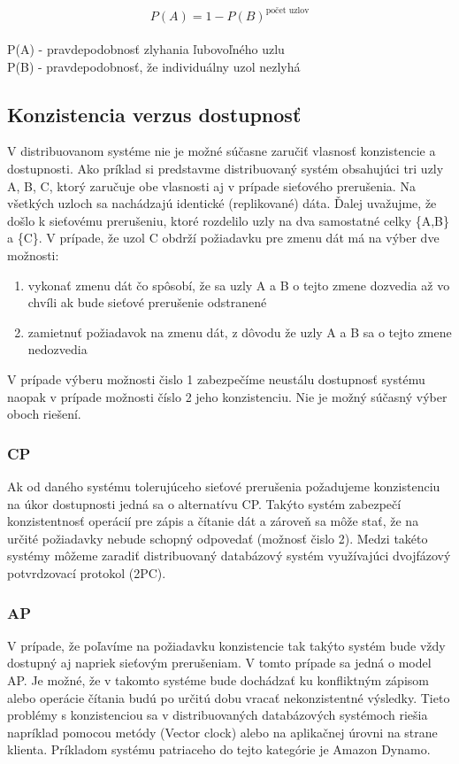 \documentclass[11pt,twoside,a4paper]{book}
\begin{document}
$$P(A) = 1 - P(B)^{\textrm{počet uzlov}}$$
\\
P(A) - pravdepodobnosť zlyhania ľubovoľného uzlu \\
P(B) - pravdepodobnosť, že individuálny uzol nezlyhá

\subsection{Konzistencia verzus dostupnosť}

V distribuovanom systéme nie je možné súčasne zaručiť vlasnosť konzistencie a dostupnosti. Ako príklad si predstavme distribuovaný systém obsahujúci tri uzly A, B, C, ktorý zaručuje obe vlasnosti aj v prípade sieťového prerušenia. Na všetkých uzloch sa nachádzajú identické (replikované) dáta. Ďalej uvažujme, že došlo k sieťovému prerušeniu, ktoré rozdelilo uzly na dva samostatné celky \{A,B\} a \{C\}. V prípade, že uzol C obdrží požiadavku pre zmenu dát má na výber dve možnosti:
\begin{enumerate}
 \item vykonať zmenu dát čo spôsobí, že sa uzly A a B o tejto zmene dozvedia až vo chvíli ak bude sieťové prerušenie odstranené
 \item zamietnuť požiadavok na zmenu dát, z dôvodu že uzly A a B sa o tejto zmene nedozvedia
\end{enumerate}

V prípade výberu možnosti čislo 1 zabezpečíme neustálu dostupnosť systému naopak v prípade možnosti číslo 2 jeho konzistenciu. Nie je možný súčasný výber oboch riešení.

\subsubsection*{CP}
Ak od daného systému tolerujúceho sieťové prerušenia požadujeme konzistenciu na úkor dostupnosti jedná sa o alternatívu CP. Takýto systém zabezpečí konzistentnosť operácií pre zápis a čítanie dát a zároveň sa môže stať, že na určité požiadavky nebude schopný odpovedať (možnosť čislo 2). Medzi takéto systémy môžeme zaradiť distribuovaný databázový systém využívajúci dvojfázový potvrdzovací protokol (2PC).

\subsubsection*{AP}
V prípade, že poľavíme na požiadavku konzistencie tak takýto systém bude vždy dostupný aj napriek sieťovým prerušeniam. V tomto prípade sa jedná o model AP. Je možné, že v takomto systéme bude dochádzať ku konfliktným zápisom alebo operácie čítania budú po určitú dobu vracať nekonzistentné výsledky. Tieto problémy s konzistenciou sa v distribuovaných databázových systémoch riešia napríklad pomocou metódy  (Vector clock) \cite{TODO} alebo na aplikačnej úrovni na strane klienta. Príkladom systému patriaceho do tejto kategórie je Amazon Dynamo.
\end{document}

